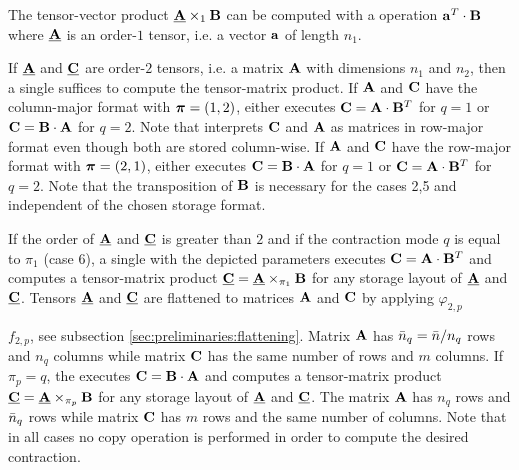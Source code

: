 




The tensor-vector product $\underline{\mathbf{A}} \times_1 \mathbf{B}$ can be computed with a  operation $\mathbf{a}^T \cdot \mathbf{B}$ where $\underline{\mathbf{A}}$ is an order-$1$ tensor, i.e. a vector $\mathbf{a}$ of length $n_1$.

If $\underline{\mathbf{A}}$ and $\underline{\mathbf{C}}$ are order-$2$ tensors, i.e. a matrix $\mathbf{A}$ with dimensions $n_1$ and $n_2$, then a single  suffices to compute the tensor-matrix product. 
If $\mathbf{A}$ and $\mathbf{C}$ have the column-major format with $\boldsymbol{\pi}=(1,2)$,  either executes $\mathbf{C} = \mathbf{A} \cdot \mathbf{B}^T$ for $q =1$ or $\mathbf{C} = \mathbf{B} \cdot \mathbf{A}$ for $q=2$.
Note that  interprets $\mathbf{C}$ and $\mathbf{A}$ as matrices in row-major format even though both are stored column-wise.
If $\mathbf{A}$ and $\mathbf{C}$ have the row-major format with $\boldsymbol{\pi}=(2,1)$,  either executes $\mathbf{C} = \mathbf{B} \cdot \mathbf{A}$ for $q =1$ or $\mathbf{C} = \mathbf{A} \cdot \mathbf{B}^T$ for $q=2$. 
Note that the transposition of $\mathbf{B}$ is necessary for the cases 2,5 and independent of the chosen storage format.

If the order of $\underline{\mathbf{A}}$ and $\underline{\mathbf{C}}$ is greater than $2$ and if the contraction mode $q$ is equal to $\pi_1$ (case 6), a single  with the depicted parameters executes $\mathbf{C} = \mathbf{A} \cdot \mathbf{B}^T$ and computes a tensor-matrix product $\underline{\mathbf{C}} = \underline{\mathbf{A}} \times_{\pi_1} \mathbf{B}$ for any storage layout of $\underline{\mathbf{A}}$ and $\underline{\mathbf{C}}$.
Tensors $\underline{\mathbf{A}}$ and $\underline{\mathbf{C}}$ are flattened to matrices $\mathbf{A}$ and $\mathbf{C}$ by applying $\varphi_{2,p}$ 

$f_{2,p}$, see subsection \ref{sec:preliminaries:flattening}.
Matrix $\mathbf{A}$ has $\bar{n}_q = \bar{n} / n_q$ rows and $n_q$ columns while matrix $\mathbf{C}$ has the same number of rows and $m$ columns.
If $\pi_p=q$, the  executes $\mathbf{C} = \mathbf{B} \cdot \mathbf{A}$ and computes a tensor-matrix product $\underline{\mathbf{C}} = \underline{\mathbf{A}} \times_{\pi_p} \mathbf{B}$ for any storage layout of $\underline{\mathbf{A}}$ and $\underline{\mathbf{C}}$.
The matrix $\mathbf{A}$ has $n_q$ rows and $\bar{n}_q$ rows while matrix $\mathbf{C}$ has $m$ rows and the same number of columns.
Note that in all cases no copy operation is performed in order to compute the desired contraction.


